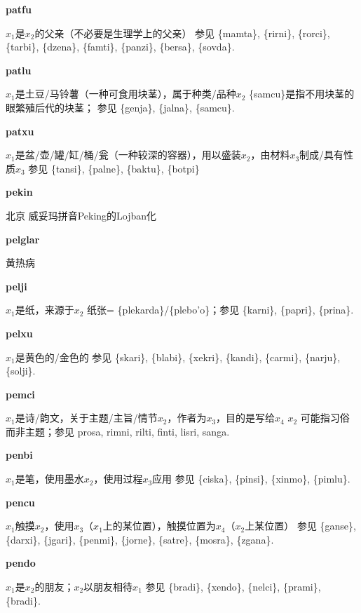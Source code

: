 \documentclass[notitlepage,twocolumn,a4paper,10pt]{book}
\begin{document}
{\sffamily\bfseries patfu}\enspace {\ttfamily\bfseries[paf     pa'u]}  $x_1$是$x_2$的父亲（不必要是生理学上的父亲） \textemdash{} 参见 \{mamta\}, \{rirni\}, \{rorci\}, \{tarbi\}, \{dzena\}, \{famti\}, \{panzi\}, \{bersa\}, \{sovda\}.

{\sffamily\bfseries patlu} $x_1$是土豆\slash{}马铃薯（一种可食用块茎），属于种类\slash{}品种$x_2$ \textemdash{} \{samcu\}是指不用块茎的眼繁殖后代的块茎； 参见 \{genja\}, \{jalna\}, \{samcu\}.

{\sffamily\bfseries patxu}\enspace {\ttfamily\bfseries[pax]}  $x_1$是盆\slash{}壶\slash{}罐\slash{}缸\slash{}桶\slash{}瓮（一种较深的容器），用以盛装$x_2$，由材料$x_3$制成\slash{}具有性质$x_3$ \textemdash{} 参见 \{tansi\}, \{palne\}, \{baktu\}, \{botpi\}

{\sffamily\bfseries pekin} 北京 \textemdash{} 威妥玛拼音Peking的Lojban化

{\sffamily\bfseries pelglar} 黄热病

{\sffamily\bfseries pelji}\enspace {\ttfamily\bfseries[    ple]}  $x_1$是纸，来源于$x_2$ \textemdash{} 纸张= \{plekarda\}\slash{}\{plebo'o\}；参见 \{karni\}, \{papri\}, \{prina\}.

{\sffamily\bfseries pelxu}\enspace {\ttfamily\bfseries[pel]}  $x_1$是黄色的\slash{}金色的 \textemdash{} 参见 \{skari\}, \{blabi\}, \{xekri\}, \{kandi\}, \{carmi\}, \{narju\}, \{solji\}.

{\sffamily\bfseries pemci}\enspace {\ttfamily\bfseries[pem]}  $x_1$是诗\slash{}韵文，关于主题\slash{}主旨\slash{}情节$x_2$，作者为$x_3$，目的是写给$x_4$ \textemdash{} $x_2$ 可能指习俗而非主题；参见 {prosa}, {rimni}, {rilti}, {finti}, {lisri}, {sanga}.

{\sffamily\bfseries penbi}\enspace {\ttfamily\bfseries[peb]}  $x_1$是笔，使用墨水$x_2$，使用过程$x_3$应用 \textemdash{} 参见 \{ciska\}, \{pinsi\}, \{xinmo\}, \{pimlu\}.

{\sffamily\bfseries pencu}\enspace {\ttfamily\bfseries[pec     pe'u]}  $x_1$触摸$x_2$，使用$x_3$（$x_1$上的某位置），触摸位置为$x_4$（$x_2$上某位置） \textemdash{} 参见 \{ganse\}, \{darxi\}, \{jgari\}, \{penmi\}, \{jorne\}, \{satre\}, \{mosra\}, \{zgana\}.

{\sffamily\bfseries pendo}\enspace {\ttfamily\bfseries[ped     pe'o]}  $x_1$是$x_2$的朋友；$x_2$以朋友相待$x_1$ \textemdash{} 参见 \{bradi\}, \{xendo\}, \{nelci\}, \{prami\}, \{bradi\}.
\end{document}
